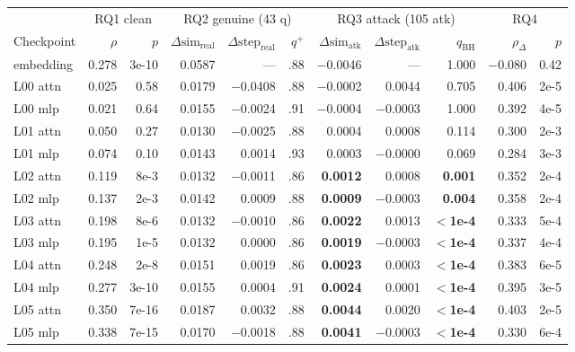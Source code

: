 \documentclass[11pt]{article}
\newcommand{\dsim}{\ensuremath{\Delta\mathrm{sim}}}
\newcommand{\dstep}{\ensuremath{\Delta\mathrm{step}}}
\begin{document}
\begin{table}[H]
\centering\footnotesize
\setlength{\tabcolsep}{3.2pt}
\begin{tabular}{@{}l r r r r r r r r r r@{}}
\toprule
 & \multicolumn{2}{c}{RQ1 clean} & \multicolumn{3}{c}{RQ2 genuine (43 q)} & \multicolumn{3}{c}{RQ3 attack (105 atk)} & \multicolumn{2}{c}{RQ4} \\
\cmidrule(lr){2-3}\cmidrule(lr){4-6}\cmidrule(lr){7-9}\cmidrule(lr){10-11}
Checkpoint & $\rho$ & $p$ & $\dsim_{\mathrm{real}}$ & $\dstep_{\mathrm{real}}$ & $q^+$ & $\dsim_{\mathrm{atk}}$ & $\dstep_{\mathrm{atk}}$ & $q_{\mathrm{BH}}$ & $\rho_{\Delta}$ & $p$ \\
\midrule
embedding     & 0.278 & 3e-10 & 0.0587 &   ---   & .88 & $-$0.0046 &    ---    & 1.000 & $-$0.080 & 0.42 \\
L00 attn      & 0.025 & 0.58  & 0.0179 & $-$0.0408 & .88 & $-$0.0002 &  0.0044   & 0.705 & 0.406 & 2e-5 \\
L00 mlp       & 0.021 & 0.64  & 0.0155 & $-$0.0024 & .91 & $-$0.0004 & $-$0.0003 & 1.000 & 0.392 & 4e-5 \\
L01 attn      & 0.050 & 0.27  & 0.0130 & $-$0.0025 & .88 &  0.0004 &  0.0008   & 0.114 & 0.300 & 2e-3 \\
L01 mlp       & 0.074 & 0.10  & 0.0143 &  0.0014 & .93 &  0.0003 & $-$0.0000 & 0.069 & 0.284 & 3e-3 \\
L02 attn      & 0.119 & 8e-3  & 0.0132 & $-$0.0011 & .86 &  \textbf{0.0012} &  0.0008 & \textbf{0.001} & 0.352 & 2e-4 \\
L02 mlp       & 0.137 & 2e-3  & 0.0142 &  0.0009 & .88 &  \textbf{0.0009} & $-$0.0003 & \textbf{0.004} & 0.358 & 2e-4 \\
L03 attn      & 0.198 & 8e-6  & 0.0132 & $-$0.0010 & .86 &  \textbf{0.0022} &  0.0013 & \textbf{$<$1e-4} & 0.333 & 5e-4 \\
L03 mlp       & 0.195 & 1e-5  & 0.0132 &  0.0000 & .86 &  \textbf{0.0019} & $-$0.0003 & \textbf{$<$1e-4} & 0.337 & 4e-4 \\
L04 attn      & 0.248 & 2e-8  & 0.0151 &  0.0019 & .86 &  \textbf{0.0023} &  0.0003 & \textbf{$<$1e-4} & 0.383 & 6e-5 \\
L04 mlp       & 0.277 & 3e-10 & 0.0155 &  0.0004 & .91 &  \textbf{0.0024} &  0.0001 & \textbf{$<$1e-4} & 0.395 & 3e-5 \\
L05 attn      & 0.350 & 7e-16 & 0.0187 &  0.0032 & .88 &  \textbf{0.0044} &  0.0020 & \textbf{$<$1e-4} & 0.403 & 2e-5 \\
L05 mlp       & 0.338 & 7e-15 & 0.0170 & $-$0.0018 & .88 &  \textbf{0.0041} & $-$0.0003 & \textbf{$<$1e-4} & 0.330 & 6e-4 \\

\end{tabular}
\end{table}
\end{document}
